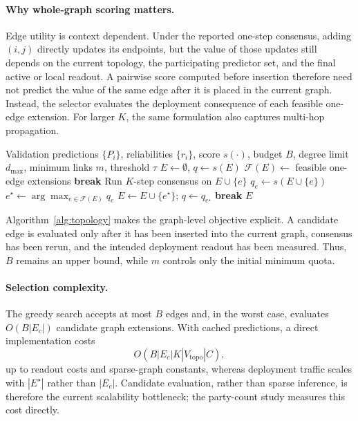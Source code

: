 \documentclass[letterpaper]{article} %
\begin{document}
\paragraph{Why whole-graph scoring matters.}
Edge utility is context dependent. Under the reported one-step consensus,
adding $(i,j)$ directly updates its endpoints, but the value of those updates
still depends on the current topology, the participating predictor set, and the
final active or local readout. A pairwise score computed before insertion
therefore need not predict the value of the same edge after it is placed in the
current graph. Instead, the selector evaluates the deployment consequence of
each feasible one-edge extension. For larger $K$, the same formulation also
captures multi-hop propagation.

\begin{algorithm}[t]
\caption{Validation-Assisted Sparse Topology Learning}
\label{alg:topology}
\begin{algorithmic}[1]
\REQUIRE Validation predictions $\{P_i\}$, reliabilities $\{r_i\}$,
score $s(\cdot)$, budget $B$, degree limit $d_{\max}$, minimum links $m$,
threshold $\tau$
\STATE $E\leftarrow\emptyset$, $q\leftarrow s(E)$
    \STATE $\mathcal{F}(E)\leftarrow$ feasible one-edge extensions
        \STATE \textbf{break}
    \ENDIF
        \STATE Run $K$-step consensus on $E\cup\{e\}$
        \STATE $q_e\leftarrow s(E\cup\{e\})$
    \ENDFOR
    \STATE $e^\star\leftarrow\arg\max_{e\in\mathcal{F}(E)} q_e$
        \STATE $E\leftarrow E\cup\{e^\star\}$; $q\leftarrow q_{e^\star}$
    \ELSE
        \STATE \textbf{break}
    \ENDIF
\ENDWHILE
\RETURN $E$
\end{algorithmic}
\end{algorithm}

Algorithm~\ref{alg:topology} makes the graph-level objective explicit. A
candidate edge is evaluated only after it has been inserted into the current
graph, consensus has been rerun, and the intended deployment readout has been
measured. Thus, $B$ remains an upper bound, while $m$ controls only the
initial minimum quota.

\paragraph{Selection complexity.}
The greedy search accepts at most $B$ edges and, in the worst case, evaluates
$O(B|E_c|)$ candidate graph extensions. With cached predictions, a direct
implementation costs
\[
O(B|E_c|K|V_{\mathrm{topo}}|C),
\]
up to readout costs and sparse-graph constants, whereas deployment traffic
scales with $|E^\star|$ rather than $|E_c|$. Candidate evaluation, rather than
sparse inference, is therefore the current scalability bottleneck; the
party-count study measures this cost directly.
\end{document}
